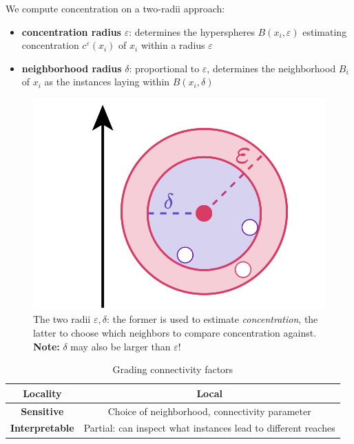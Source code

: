 \begin{paracol}{2}
   We compute concentration on a two-radii approach:
   \begin{itemize}
      \item \textbf{concentration radius} $\varepsilon$: determines the hyperspheres $B(x_i, \varepsilon)$ estimating concentration $c^{\varepsilon}(x_i)$ of $x_i$ within a radius $\varepsilon$
      \item \textbf{neighborhood radius} $\delta$: proportional to $\varepsilon$, determines the neighborhood $B_i$ of $x_i$ as the instances laying within $B(x_i, \delta)$
   \end{itemize}

   \switchcolumn

   \begin{figure}[htbp]
      \centering
      \includegraphics{images/06/tworadii.png}
      \caption{The two radii $\varepsilon, \delta$: the former is used to estimate \textit{concentration}, the latter to choose which neighbors to compare concentration against. \textbf{Note:} $\delta$ may also be larger than $\varepsilon$!}
      \label{fig:06/tworadii}
   \end{figure}
\end{paracol}

\begin{table}[htbp]
   \centering
   \begin{tabular}{|c|c|}
      \hline
      \textbf{Locality} & \textbf{Local} \\
      \hline
      \textbf{Sensitive} & Choice of neighborhood, connectivity parameter \\
      \hline
      \textbf{Interpretable} & Partial: can inspect what instances lead to different reaches\\
      \hline
   \end{tabular}
   \caption{Grading connectivity factors}
   \label{tab:06/connectivity}
\end{table}

